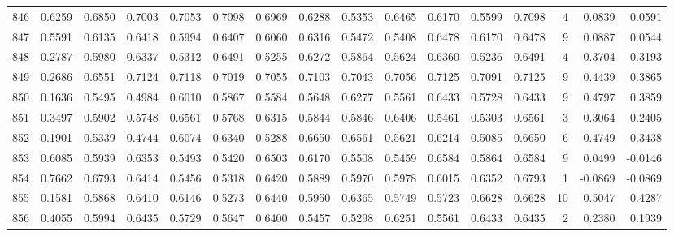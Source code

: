 \begin{tabular}{lrrrrrrrrrrrrrrr}
846 &      0.6259 &  0.6850 &  0.7003 &  0.7053 &  0.7098 &  0.6969 &  0.6288 &  0.5353 &  0.6465 &  0.6170 &   0.5599 &     0.7098 &      4 &                    0.0839 &                     0.0591 \\
847 &      0.5591 &  0.6135 &  0.6418 &  0.5994 &  0.6407 &  0.6060 &  0.6316 &  0.5472 &  0.5408 &  0.6478 &   0.6170 &     0.6478 &      9 &                    0.0887 &                     0.0544 \\
848 &      0.2787 &  0.5980 &  0.6337 &  0.5312 &  0.6491 &  0.5255 &  0.6272 &  0.5864 &  0.5624 &  0.6360 &   0.5236 &     0.6491 &      4 &                    0.3704 &                     0.3193 \\
849 &      0.2686 &  0.6551 &  0.7124 &  0.7118 &  0.7019 &  0.7055 &  0.7103 &  0.7043 &  0.7056 &  0.7125 &   0.7091 &     0.7125 &      9 &                    0.4439 &                     0.3865 \\
850 &      0.1636 &  0.5495 &  0.4984 &  0.6010 &  0.5867 &  0.5584 &  0.5648 &  0.6277 &  0.5561 &  0.6433 &   0.5728 &     0.6433 &      9 &                    0.4797 &                     0.3859 \\
851 &      0.3497 &  0.5902 &  0.5748 &  0.6561 &  0.5768 &  0.6315 &  0.5844 &  0.5846 &  0.6406 &  0.5461 &   0.5303 &     0.6561 &      3 &                    0.3064 &                     0.2405 \\
852 &      0.1901 &  0.5339 &  0.4744 &  0.6074 &  0.6340 &  0.5288 &  0.6650 &  0.6561 &  0.5621 &  0.6214 &   0.5085 &     0.6650 &      6 &                    0.4749 &                     0.3438 \\
853 &      0.6085 &  0.5939 &  0.6353 &  0.5493 &  0.5420 &  0.6503 &  0.6170 &  0.5508 &  0.5459 &  0.6584 &   0.5864 &     0.6584 &      9 &                    0.0499 &                    -0.0146 \\
854 &      0.7662 &  0.6793 &  0.6414 &  0.5456 &  0.5318 &  0.6420 &  0.5889 &  0.5970 &  0.5978 &  0.6015 &   0.6352 &     0.6793 &      1 &                   -0.0869 &                    -0.0869 \\
855 &      0.1581 &  0.5868 &  0.6410 &  0.6146 &  0.5273 &  0.6440 &  0.5950 &  0.6365 &  0.5749 &  0.5723 &   0.6628 &     0.6628 &     10 &                    0.5047 &                     0.4287 \\
856 &      0.4055 &  0.5994 &  0.6435 &  0.5729 &  0.5647 &  0.6400 &  0.5457 &  0.5298 &  0.6251 &  0.5561 &   0.6433 &     0.6435 &      2 &                    0.2380 &                     0.1939 \\

\end{tabular}
